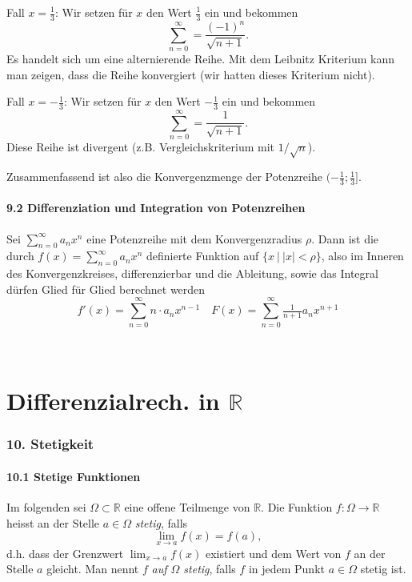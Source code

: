 \documentclass[a4paper,landscape,8pt]{extarticle}
\newcommand{\R}{\mathbb{R}}
\newcommand{\abs}[1]{\left\lvert #1 \right\rvert}
\newcommand{\setsep}{\ \vert \ }
\renewcommand*{\newpage}{ \ }
\begin{document}
\begin{multicols*}{4}
\begin{warmup}
Fall $x=\frac{1}{3}$: Wir setzen für $x$ den Wert $\frac{1}{3}$ ein und bekommen
\[
\sum_{n=0}^{\infty} = \frac{(-1)^n}{\sqrt{n+1}}.
\]
Es handelt sich um eine alternierende Reihe. Mit dem Leibnitz Kriterium kann man
zeigen, dass die Reihe konvergiert (wir hatten dieses Kriterium nicht).

Fall $x=-\frac{1}{3}$: Wir setzen für $x$ den Wert $-\frac{1}{3}$ ein und
bekommen
\[
\sum_{n=0}^{\infty} = \frac{1}{\sqrt{n+1}}.
\]
Diese Reihe ist divergent (z.B. Vergleichskriterium mit $1/\sqrt{n}$).

Zusammenfassend ist also die Konvergenzmenge der Potenzreihe
$(-\frac{1}{3};\frac{1}{3}]$.
\end{warmup}

\subsection{9.2 Differenziation und Integration von Potenzreihen}

Sei $\sum_{n=0}^\infty a_n x^n$ eine Potenzreihe mit dem Konvergenzradius
$\rho$. Dann ist die durch $f(x)=\sum_{n=0}^\infty a_n x^n$ definierte Funktion
auf $\{x \setsep \abs{x}<\rho\}$, also im Inneren des Konvergenzkreises,
differenzierbar und die Ableitung, sowie das Integral dürfen Glied für
Glied berechnet werden
\[
f'(x)=\sum_{n=0}^\infty n\cdot a_n x^{n-1} \quad  
F(x) = \sum_{n=0}^\infty \tfrac{1}{n+1}a_n x^{n+1}
\]




\newpage

\part{Differenzialrech. in $\R$}

\section{10. Stetigkeit}

\subsection{10.1 Stetige Funktionen}

\Def Im folgenden sei $\Omega\subset \R$ eine offene Teilmenge von $\R$. Die
Funktion $f\colon \Omega \to \R	$ heisst an der Stelle $a\in\Omega$
\emph{stetig}, falls
\[
\lim_{x\to a} f(x) = f(a),
\]
d.h. dass der Grenzwert $\lim_{x\to a}f(x)$ existiert und dem Wert von $f$ an
der Stelle $a$ gleicht. Man nennt $f$ \emph{auf $\Omega$ stetig}, falls $f$ in
jedem Punkt $a\in\Omega$ stetig ist.


\end{multicols*}
\end{document}
